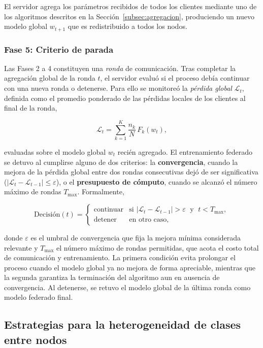 El servidor agrega los parámetros recibidos de todos los clientes mediante uno de los
algoritmos descritos en la Sección~\ref{subsec:agregacion}, produciendo un nuevo modelo
global $w_{t+1}$ que es redistribuido a todos los nodos.
 
\subsubsection*{Fase 5: Criterio de parada}
 
Las Fases 2 a 4 constituyen una \emph{ronda} de comunicación. Tras completar la agregación
global de la ronda $t$, el servidor evaluó si el proceso debía continuar con una nueva ronda
o detenerse. Para ello se monitoreó la \textit{pérdida global} $\mathcal{L}_t$, definida como
el promedio ponderado de las pérdidas locales de los clientes al final de la ronda,

\[
\mathcal{L}_t = \sum_{k=1}^{K} \frac{n_k}{N}\, F_k\!\left(w_{t}\right),
\]

evaluadas sobre el modelo global $w_t$ recién agregado. El entrenamiento federado se detuvo
al cumplirse alguno de dos criterios: la \textbf{convergencia}, cuando la mejora de la
pérdida global entre dos rondas consecutivas dejó de ser significativa
($|\mathcal{L}_t - \mathcal{L}_{t-1}| \leq \varepsilon$), o el \textbf{presupuesto de
cómputo}, cuando se alcanzó el número máximo de rondas $T_{\max}$. Formalmente,

\[
\text{Decisión}(t) =
\begin{cases}
    \text{continuar} & \text{si } |\mathcal{L}_t - \mathcal{L}_{t-1}| > \varepsilon
                       \;\text{ y }\; t < T_{\max}, \\[4pt]
    \text{detener}   & \text{en otro caso,}
\end{cases}
\]

donde $\varepsilon$ es el umbral de convergencia que fija la mejora mínima considerada
relevante y $T_{\max}$ el número máximo de rondas permitidas, que acota el costo total de
comunicación y entrenamiento. La primera condición evita prolongar el proceso cuando el
modelo global ya no mejora de forma apreciable, mientras que la segunda garantiza la
terminación del algoritmo aun en ausencia de convergencia. Al detenerse, se retuvo el
modelo global de la última ronda como modelo federado final.
 
\subsection{Estrategias para la heterogeneidad de clases entre nodos}
\label{subsec:estrategias_clases}
 
